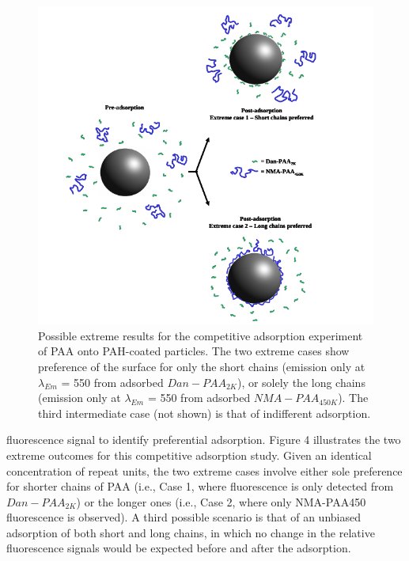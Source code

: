 \documentclass[journal=mamobx,manuscript=article]{achemso}
\begin{document}
\begin{figure}[H]
\includegraphics[scale=3.0]{fig4.png}
\caption{Possible extreme results for the competitive adsorption experiment of PAA onto PAH-coated particles.  The two extreme cases show preference of the surface for only the short chains (emission only at $\lambda_{Em}$ = 550 from adsorbed $Dan-PAA_{2K}$), or solely the long chains (emission only at $\lambda_{Em}$ = 550 from adsorbed $NMA-PAA_{450K}$).  The third intermediate case (not shown) is that of indifferent adsorption.}
\label{figure 4}
\end{figure}

fluorescence signal to identify preferential adsorption. Figure 4 illustrates the two extreme outcomes for this competitive adsorption study.  Given an identical concentration of repeat units, the two extreme cases involve either sole preference for shorter chains of PAA (i.e., Case 1, where fluorescence is only detected from $Dan-PAA_{2K}$) or the longer ones (i.e., Case 2, where only NMA-PAA450 fluorescence is observed).  A third possible scenario is that of an unbiased adsorption of both short and long chains, in which no change in the relative fluorescence signals would be expected before and after the adsorption. 
\end{document}
